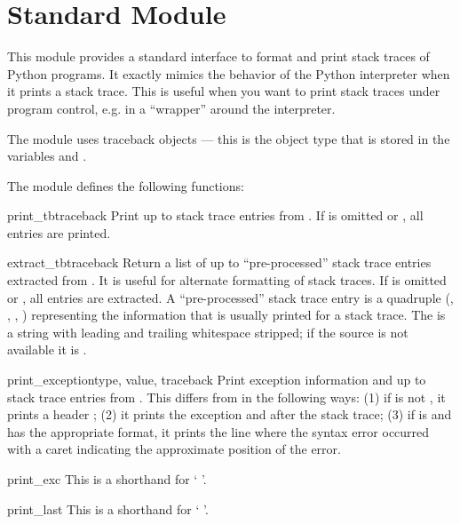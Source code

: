 \section{Standard Module }
\label{module-traceback}


This module provides a standard interface to format and print stack
traces of Python programs.  It exactly mimics the behavior of the
Python interpreter when it prints a stack trace.  This is useful when
you want to print stack traces under program control, e.g. in a
``wrapper'' around the interpreter.

The module uses traceback objects --- this is the object type
that is stored in the variables  and
.

The module defines the following functions:

\begin{funcdesc}{print_tb}{traceback}
Print up to  stack trace entries from .  If
 is omitted or , all entries are printed.
\end{funcdesc}

\begin{funcdesc}{extract_tb}{traceback}
Return a list of up to  ``pre-processed'' stack trace
entries extracted from .  It is useful for alternate
formatting of stack traces.  If  is omitted or ,
all entries are extracted.  A ``pre-processed'' stack trace entry is a
quadruple (, , ,
) representing the information that is usually printed
for a stack trace.  The  is a string with leading and
trailing whitespace stripped; if the source is not available it is
.
\end{funcdesc}

\begin{funcdesc}{print_exception}{type, value, traceback}
Print exception information and up to  stack trace entries
from .  This differs from  in the
following ways: (1) if  is not , it prints a
header ; (2) it prints the
exception  and  after the stack trace; (3) if
 is  and  has the appropriate
format, it prints the line where the syntax error occurred with a
caret indicating the approximate position of the error.
\end{funcdesc}

\begin{funcdesc}{print_exc}{}
This is a shorthand for `
  \code{)}'.
\end{funcdesc}

\begin{funcdesc}{print_last}{}
This is a shorthand for `
  \code{)}'.
\end{funcdesc}

